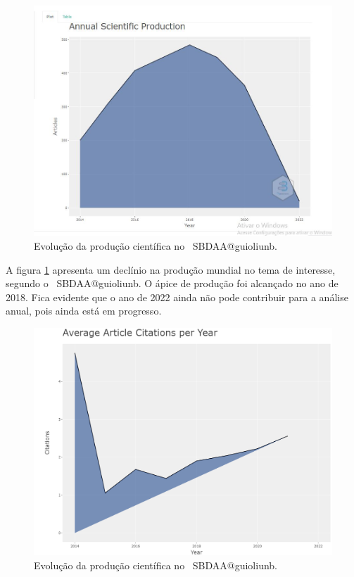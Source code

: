 \begin{figure}
    \centering
    \includegraphics[width=1\textwidth]{experiments/guioliunb/AnaliseBibliometrica/SocialBigDataAnalysis/anual-scientific-production.JPG}
    \caption{Evolução da produção científica no \dataset\   SBDAA@guioliunb.}
    \label{fig:evol:anual:SBDAA@guioliunb}
\end{figure}

A figura \ref{fig:evol:anual:SBDAA@guioliunb} apresenta um declínio na produção mundial no tema de interesse, segundo o \dataset\  SBDAA@guioliunb. O ápice de produção foi alcançado no ano de 2018. Fica evidente que o ano de 2022 ainda não pode contribuir para a análise anual, pois ainda está em progresso.

\begin{figure}
    \centering
    \includegraphics[width=1\textwidth]{experiments/guioliunb/AnaliseBibliometrica/SocialBigDataAnalysis/AVG citation per year.png}
    \caption{Evolução da produção científica no \dataset\   SBDAA@guioliunb.}
    \label{fig:evol:anual:cit:SBDAA@guioliunb}
\end{figure}




